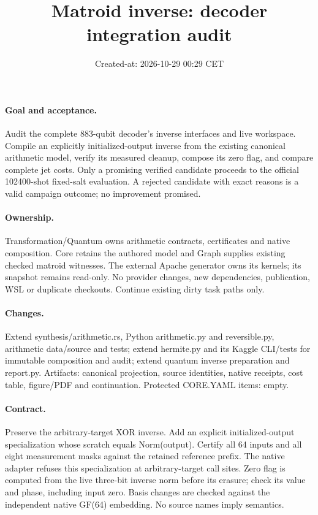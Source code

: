 \documentclass{article}
\title{Matroid inverse: decoder integration audit}
\date{Created-at: 2026-10-29 00:29 CET}
\begin{document}
\maketitle
\paragraph{Goal and acceptance.} Audit the complete 883-qubit decoder's inverse
interfaces and live workspace. Compile an explicitly initialized-output inverse
from the existing canonical arithmetic model, verify its measured cleanup,
compose its zero flag, and compare complete jet costs. Only a promising verified
candidate proceeds to the official 102400-shot fixed-salt evaluation. A rejected
candidate with exact reasons is a valid campaign outcome; no improvement promised.
\paragraph{Ownership.} Transformation/Quantum owns arithmetic contracts,
certificates and native composition. Core retains the authored model and Graph
supplies existing checked matroid witnesses. The external Apache generator owns
its kernels; its snapshot remains read-only. No provider changes, new dependencies,
publication, WSL or duplicate checkouts. Continue existing dirty task paths only.
\paragraph{Changes.} Extend synthesis/arithmetic.rs, Python arithmetic.py and
reversible.py, arithmetic data/source and tests; extend hermite.py and its Kaggle
CLI/tests for immutable composition and audit; extend quantum inverse preparation
and report.py. Artifacts: canonical projection, source identities, native receipts,
cost table, figure/PDF and continuation. Protected CORE.YAML items: empty.
\paragraph{Contract.} Preserve the arbitrary-target XOR inverse. Add an explicit
initialized-output specialization whose scratch equals Norm(output). Certify all
64 inputs and all eight measurement masks against the retained reference prefix.
The native adapter refuses this specialization at arbitrary-target call sites.
Zero flag is computed from the live three-bit inverse norm before its erasure;
check its value and phase, including input zero. Basis changes are checked against
the independent native GF(64) embedding. No source names imply semantics.
\end{document}
